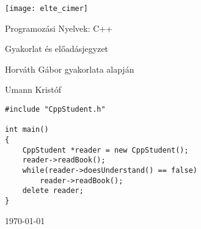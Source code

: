 \documentclass[a4paper,11.5pt, table]{article}
\theoremstyle{definition}
\newcommand{\<}{<\hspace{0mm}<} %
\newcommand{\onlyinsubfile}[1]{#1} %
\newcommand{\notinsubfile}[1]{} %
\begin{document}
	\renewcommand{\onlyinsubfile}[1]{}
	\renewcommand{\notinsubfile}[1]{#1}
	
	\begin{titlepage}
		\vspace*{2cm}
		\centering
		\texttt{[image: elte\_cimer]}
		
		\vspace*{2cm}
		{\Huge Programozási Nyelvek: C++ }
		
		\vspace{1cm}
		{\huge Gyakorlat és előadásjegyzet}
		
		\vspace*{5mm}
		{\large Horváth Gábor gyakorlata alapján}
		\vspace*{1.5cm}
		
		{\large Umann Kristóf}
		\vfill
		
		\begin{lstlisting}[frame=trbl, linewidth=12cm, xleftmargin=3.9cm, emph={CppStudent}]
#include "CppStudent.h"

int main()
{
	CppStudent *reader = new CppStudent();
	reader->readBook();
	while(reader->doesUnderstand() == false)
		reader->readBook();	
	delete reader;
}
		\end{lstlisting}
		\vfill
		
		\vspace*{1cm}
		\today
	\end{titlepage}
	\tableofcontents
	\pagebreak
	
	
	
	
	
	
	
	
	
	
	
	
\end{document}
